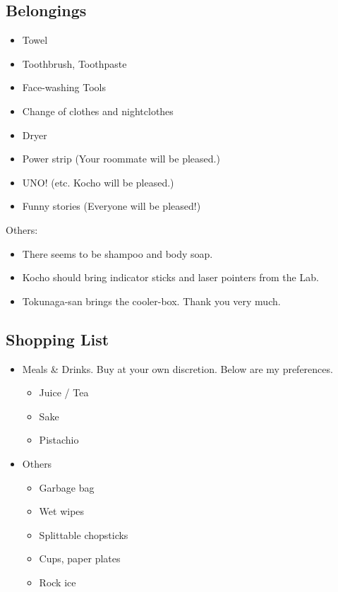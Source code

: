 \documentclass[unicode,a4paper,11pt]{ltjsarticle}
\begin{document}
\subsection*{Belongings}

\begin{itemize}
      \item
            Towel
      \item
            Toothbrush, Toothpaste
      \item
            Face-washing Tools
      \item
            Change of clothes and nightclothes
      \item
            Dryer
      \item
            Power strip (Your roommate will be pleased.)
      \item
            UNO! (etc. Kocho will be pleased.)
      \item
            Funny stories (Everyone will be pleased!)
\end{itemize}

Others:
\begin{itemize}
      \item
            There seems to be shampoo and body soap.
      \item
            Kocho should bring indicator sticks and laser pointers from the Lab.
      \item
            Tokunaga-san brings the cooler-box. Thank you very much.
\end{itemize}


\subsection*{Shopping List}

\begin{itemize}
      \item
            Meals \& Drinks. Buy at your own discretion. Below are my preferences.
            \begin{itemize}
                  \item
                        Juice / Tea
                  \item
                        Sake
                  \item
                        Pistachio
            \end{itemize}
      \item
            Others
            \begin{itemize}
                  \item
                        Garbage bag
                  \item
                        Wet wipes
                  \item
                        Splittable chopsticks
                  \item
                        Cups, paper plates
                  \item
                        Rock ice
            \end{itemize}
\end{itemize}
\end{document}
